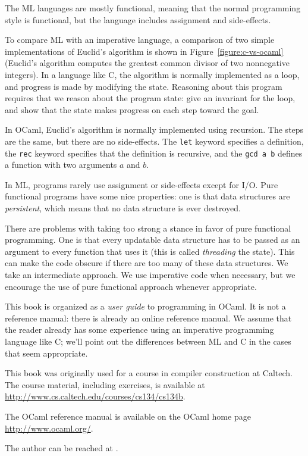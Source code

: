 
The ML languages are mostly functional, meaning that the normal
programming style is functional, but the language includes assignment and
side-effects.

%
To compare ML with an imperative language, a comparison of two simple
implementations of Euclid's algorithm is shown in
Figure~\ref{figure:c-vs-ocaml} (Euclid's algorithm computes the
greatest common divisor of two nonnegative integers).  In a language
like C, the algorithm is normally implemented as a loop, and progress
is made by modifying the state.  Reasoning about this program requires
that we reason about the program state: give an invariant for the
loop, and show that the state makes progress on each step toward the
goal.

In OCaml, Euclid's algorithm is normally implemented using recursion.
The steps are the same, but there are no side-effects.  The \texttt{let}
keyword specifies a definition, the \texttt{rec} keyword specifies that
the definition is recursive, and the \texttt{gcd a b} defines a function
with two arguments $a$ and $b$.

In ML, programs rarely use assignment or side-effects except for I/O.
Pure functional programs have some nice properties: one is that data
structures are \emph{persistent}, which means that no
data structure is ever destroyed.

There are problems with taking too strong a stance in favor of
pure functional programming.  One is that every updatable data structure
has to be passed as an argument to every function that uses it (this
is called \emph{threading} the state).  This can make the code obscure
if there are too many of these data structures.  We take an intermediate
approach.  We use imperative code when necessary, but we encourage
the use of pure functional approach whenever appropriate.


This book is organized as a \emph{user guide} to programming in
OCaml.  It is not a reference manual: there is already an online
reference manual.  We assume that the reader already has some
experience using an imperative programming language like C; we'll point
out the differences between ML and C in the cases that seem
appropriate.


This book was originally used for a course in compiler
construction at Caltech.  The course material, including exercises, is
available at \url{http://www.cs.caltech.edu/courses/cs134/cs134b}.

The OCaml reference manual \cite{Ler02} is available on the
OCaml home page \url{http://www.ocaml.org/}.

The author can be reached at .
